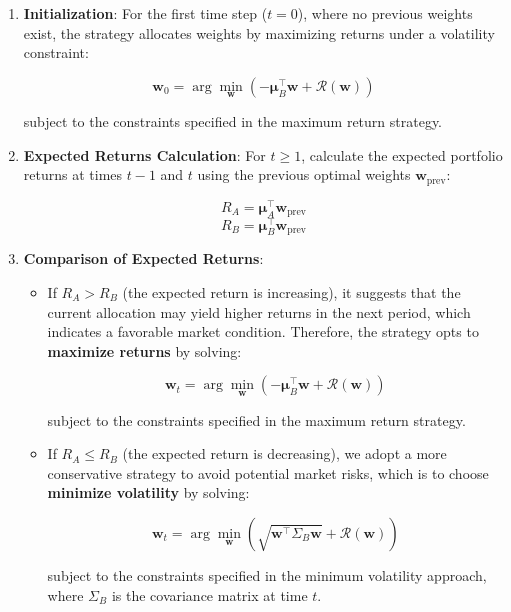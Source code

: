 \begin{enumerate}
    \item \textbf{Initialization}: For the first time step (\( t = 0 \)), where no previous weights exist, the strategy allocates weights by maximizing returns under a volatility constraint:

    \[
    \mathbf{w}_0 = \arg\min_{\mathbf{w}} \left( -\boldsymbol{\mu}_B^\top \mathbf{w} + \mathcal{R}(\mathbf{w}) \right)
    \]
    
    subject to the constraints specified in the maximum return strategy.

    \item \textbf{Expected Returns Calculation}: For \( t \geq 1 \), calculate the expected portfolio returns at times \( t-1 \) and \( t \) using the previous optimal weights \( \mathbf{w}_{\text{prev}} \):

    \[
    R_A = \boldsymbol{\mu}_A^\top \mathbf{w}_{\text{prev}}
    \]
    \[
    R_B = \boldsymbol{\mu}_B^\top \mathbf{w}_{\text{prev}}
    \]

    \item \textbf{Comparison of Expected Returns}:
    \begin{itemize}
        \item If \( R_A > R_B \) (the expected return is increasing), it suggests that the current allocation may yield higher returns in the next period, which indicates a favorable market condition. Therefore, the strategy opts to \textbf{maximize returns} by solving:

        \[
        \mathbf{w}_t = \arg\min_{\mathbf{w}} \left( -\boldsymbol{\mu}_B^\top \mathbf{w} + \mathcal{R}(\mathbf{w}) \right)
        \]
        
        subject to the constraints specified in the maximum return strategy.

        \item If \( R_A \leq R_B \) (the expected return is decreasing), we adopt a more conservative strategy to avoid potential market risks, which is to choose \textbf{minimize volatility} by solving:

        \[
        \mathbf{w}_t = \arg\min_{\mathbf{w}} \left( \sqrt{\mathbf{w}^\top \Sigma_B \mathbf{w}} + \mathcal{R}(\mathbf{w}) \right)
        \]
        
        subject to the constraints specified in the minimum volatility approach, where \( \Sigma_B \) is the covariance matrix at time \( t \).
    \end{itemize}


\end{enumerate}
